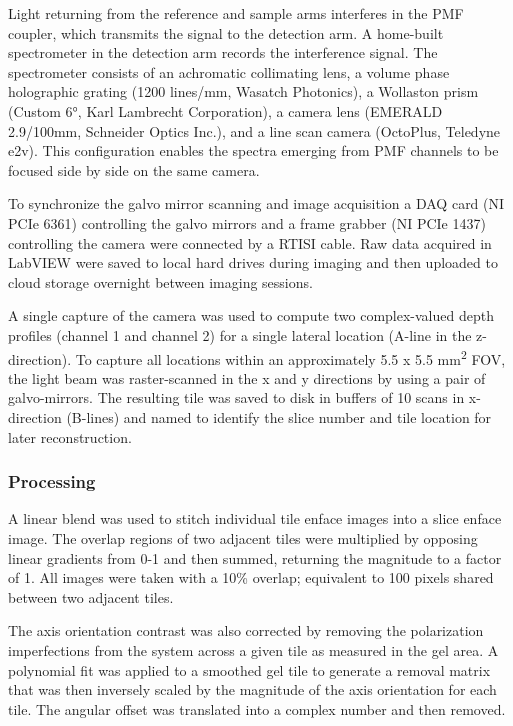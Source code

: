 \documentclass{article}
\begin{document}
Light returning from the reference and sample arms interferes in the PMF coupler, which transmits the signal to the detection arm. A home-built spectrometer in the detection arm records the interference signal. The spectrometer consists of an achromatic collimating lens, a volume phase holographic grating (1200 lines/mm, Wasatch Photonics), a Wollaston prism (Custom 6°, Karl Lambrecht Corporation), a camera lens (EMERALD 2.9/100mm, Schneider Optics Inc.), and a line scan camera (OctoPlus, Teledyne e2v). This configuration enables the spectra emerging from PMF channels to be focused side by side on the same camera.

To synchronize the galvo mirror scanning and image acquisition a DAQ card (NI PCIe 6361) controlling the galvo mirrors and a frame grabber (NI PCIe 1437) controlling the camera were connected by a RTISI cable. Raw data acquired in LabVIEW were saved to local hard drives during imaging and then uploaded to cloud storage overnight between imaging sessions.

A single capture of the camera was used to compute two complex-valued depth profiles (channel 1 and channel 2) for a single lateral location (A-line in the z-direction). To capture all locations within an approximately 5.5 x 5.5 mm\textsuperscript{2} FOV, the light beam was raster-scanned in the x and y directions by using a pair of galvo-mirrors. The resulting tile was saved to disk in buffers of 10 scans in x-direction (B-lines) and named to identify the slice number and tile location for later reconstruction.

\subsubsection*{Processing}

A linear blend was used to stitch individual tile enface images into a slice enface image. The overlap regions of two adjacent tiles were multiplied by opposing linear gradients from 0-1 and then summed, returning the magnitude to a factor of 1. All images were taken with a 10\% overlap; equivalent to 100 pixels shared between two adjacent tiles.

The axis orientation contrast was also corrected by removing the polarization imperfections from the system across a given tile as measured in the gel area. A polynomial fit was applied to a smoothed gel tile to generate a removal matrix that was then inversely scaled by the magnitude of the axis orientation for each tile. The angular offset was translated into a complex number and then removed.
\end{document}

